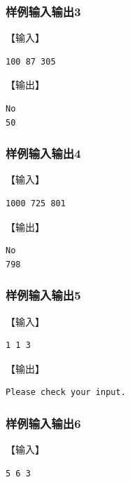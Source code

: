 \documentclass{article}
\begin{document}
\subsubsection{样例输入输出3}

【输入】

\begin{lstlisting}[language={bash},
    basicstyle=\small\menlo]
100 87 305
\end{lstlisting}

【输出】

\begin{lstlisting}[language={bash},
    basicstyle=\small\menlo]
No
50
\end{lstlisting}

\subsubsection{样例输入输出4}

【输入】

\begin{lstlisting}[language={bash},
    basicstyle=\small\menlo]
1000 725 801
\end{lstlisting}

【输出】

\begin{lstlisting}[language={bash},
    basicstyle=\small\menlo]
No
798
\end{lstlisting}

\subsubsection{样例输入输出5}

【输入】

\begin{lstlisting}[language={bash},
    basicstyle=\small\menlo]
1 1 3
\end{lstlisting}

【输出】

\begin{lstlisting}[language={bash},
    basicstyle=\small\menlo]
Please check your input.
\end{lstlisting}

\subsubsection{样例输入输出6}

【输入】

\begin{lstlisting}[language={bash},
    basicstyle=\small\menlo]
5 6 3
\end{lstlisting}
\end{document}
